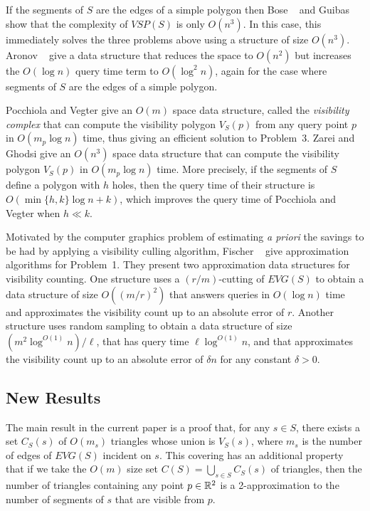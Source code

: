 \documentclass{patmorin}
\newcommand{\EVG}{\mathit{EVG}}
\newcommand{\VSP}{\mathit{VSP}}
\begin{document}
If the segments of $S$ are the edges of a simple polygon then Bose \etal\
\cite{blm02} and Guibas \etal\ \cite{gmr97} show that the complexity of
$\VSP(S)$ is only $O(n^3)$.  In this case, this immediately solves the
three problems above using a structure of size $O(n^3)$.  Aronov \etal\
\cite{agtz02} give a data structure that reduces the space to $O(n^2)$
but increases the $O(\log n)$ query time term to $O(\log^2 n)$, again
for the case where segments of $S$ are the edges of a simple polygon.

Pocchiola and Vegter \cite{pv96} give an $O(m)$ space data structure,
called the \emph{visibility complex} that can compute the visibility
polygon $V_S(p)$ from any query point $p$ in $O(m_p \log n)$ time,
thus giving an efficient solution to Problem~3.  Zarei and Ghodsi give
an $O(n^3)$ space data structure that can compute the visibility polygon
$V_S(p)$ in $O(m_p \log n)$ time.  More precisely, if the segments of $S$
define a polygon with $h$ holes, then the query time of their structure
is $O(\min\{h,k\}\log n + k)$, which improves the query time of Pocchiola
and Vegter when $h \ll k$.

Motivated by the computer graphics problem of estimating \emph{a priori}
the savings to be had by applying a visibility culling algorithm,
Fischer \etal\ \cite{fhjmz08,fhjmz09} give approximation algorithms for
Problem~1.  They present two approximation data structures for visibility
counting. One structure uses a $(r/m)$-cutting \cite[Section~4.5]{m02}
of $\EVG(S)$ to obtain a data structure of size $O((m/r)^2)$ that answers
queries in $O(\log n)$ time and approximates the visibility count up to
an absolute error of $r$.  Another structure uses random sampling to
obtain a data structure of size $(m^2\log^{O(1)} n)/\ell$, that has query
time $\ell\log^{O(1)} n$, and that approximates the visibility count up to
an absolute error of $\delta n$ for any constant $\delta > 0$.

\subsection{New Results}

The main result in the current paper is a proof that, for any $s\in S$,
there exists a set $C_S(s)$ of $O(m_s)$ triangles whose union is $V_S(s)$,
where $m_s$ is the number of edges of $\EVG(S)$ incident on $s$.  This
covering has an additional property that if we take the $O(m)$ size set
$C(S)=\bigcup_{s\in S}C_S(s)$ of triangles, then the number of triangles
containing any point $p\in\mathbb{R}^2$ is a 2-approximation to the number of
segments of $s$ that are visible from $p$.
\end{document}
